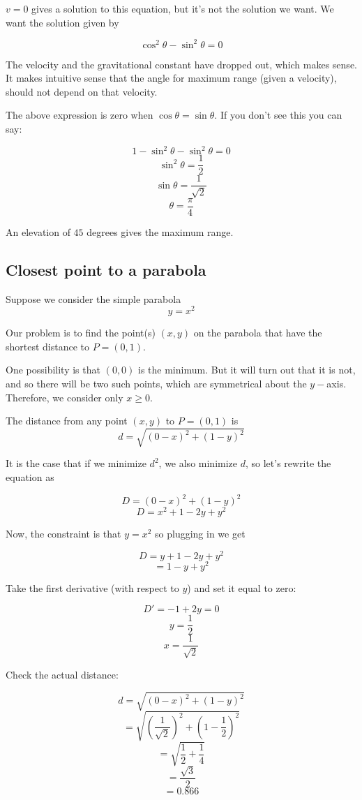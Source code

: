 \documentclass[11pt, oneside]{article}
\begin{document}
$v = 0$ gives a solution to this equation, but it's not the solution we want.  We want the solution given by

\[ \cos^2 \theta - \sin^2 \theta = 0 \]

The velocity and the gravitational constant have dropped out, which makes sense.  It makes intuitive sense that the angle for maximum range (given a velocity), should not depend on that velocity.

The above expression is zero when $\cos \theta = \sin \theta$.  If you don't see this you can say:

\[ 1 - \sin^2 \theta - \sin^2 \theta = 0 \]
\[ \sin^2 \theta = \frac{1}{2} \]
\[ \sin \theta = \frac{1}{\sqrt{2}} \]
\[ \theta = \frac{\pi}{4} \]

An elevation of $45$ degrees gives the maximum range.

\subsection*{Closest point to a parabola}

Suppose we consider the simple parabola
\[ y = x^2 \]

Our problem is to find the point(s) $(x,y)$ on the parabola that have the shortest distance to $P=(0,1)$.

One possibility is that $(0,0)$ is the minimum.  But it will turn out that it is not, and so there will be two such points, which are symmetrical about the $y-$axis.  Therefore, we consider only $x \ge 0$.

The distance from any point $(x,y)$ to $P=(0,1)$ is
\[ d = \sqrt{(0-x)^2 + (1-y)^2} \]

It is the case that if we minimize $d^2$, we also minimize $d$, so let's rewrite the equation as

\[ D = (0-x)^2 + (1-y)^2 \]
\[ D = x^2 + 1 - 2y + y^2 \]

Now, the constraint is that $y=x^2$ so plugging in we get

\[ D = y + 1 - 2y + y^2 \]
\[ = 1 - y + y^2 \]

Take the first derivative (with respect to $y$) and set it equal to zero:

\[ D' = -1 + 2y = 0 \]
\[ y = \frac{1}{2} \]
\[ x = \frac{1}{\sqrt{2}} \]

Check the actual distance:

\[ d = \sqrt{(0-x)^2 + (1-y)^2} \]
\[ = \sqrt{(\frac{1}{\sqrt{2}})^2 + (1- \frac{1}{2})^2 } \]
\[ = \sqrt{\frac{1}{2} + \frac{1}{4}} \]
\[ = \frac{\sqrt{3}}{2} \]
\[ = 0.866 \]
\end{document}
